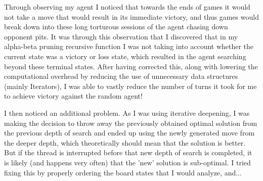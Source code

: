 \documentclass{article}
\begin{document}
Through observing my agent I noticed that towards the ends of games it would not take a move that would result in its immediate victory, and thus
games would break down into these long torturous sessions of the agent chasing down opponent pits. It was through this observation that
I discovered that in my alpha-beta pruning recursive function I was not taking into account whether the current state was a victory or loss state,
which resulted in the agent searching beyond these terminal states. After having corrected this, along with lowering the computational overhead by reducing
the use of unnecessary data structures (mainly Iterators), I was able to vastly reduce the number of turns it took for me to achieve victory against 
the random agent!

I then noticed an additional problem. As I was using iterative deepening, I was making the decision to throw away the previously obtained optimal solution from the
previous depth of search and ended up using the newly generated move from the deeper depth, which theoretically should mean that the solution is better. But if the thread
is interrupted before that new depth of search is completed, it is likely (and happens very often) that the 'new' solution is sub-optimal. I tried fixing this by properly ordering
the board states that I would analyze, and...
\end{document}
